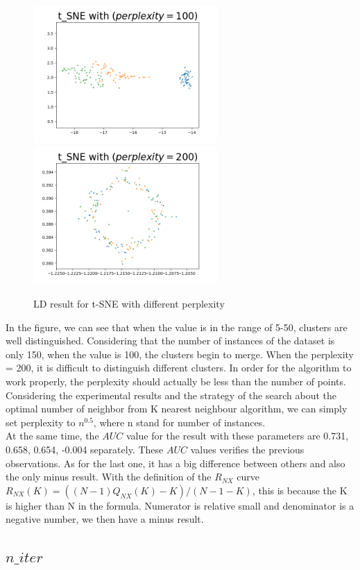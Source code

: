 \begin{figure}[H]
\centering  %
{
\label{Fig.sub.1}
\includegraphics[width=7cm,height=3.5cm\textwidth]{images/image_comparison_tsne_perp100.png}}
{
\label{Fig.sub.2}
\includegraphics[width=7cm,height=3.5cm\textwidth]{images/image_comparison_tsne_perp200.png}}
\caption{LD result for t-SNE with different perplexity}
\end{figure}


\noindent In the figure, we can see that when the value is in the range of 5-50, clusters are well distinguished. Considering that the number of instances of the dataset is only 150, when the value is 100, the clusters begin to merge. When the perplexity = 200, it is difficult to distinguish different clusters. In order for the algorithm to work properly, the perplexity should actually be less than the number of points. Considering the experimental results and the strategy of the search about the optimal number of neighbor from K nearest neighbour algorithm\cite{ref12}, we can simply set perplexity to $n^{0.5}$, where n stand for number of instances. \\

\noindent At the same time, the $AUC$ value for the result with these parameters are 0.731, 0.658, 0.654, -0.004 separately. These $AUC$ values verifies the previous observations. As for the last one, it has a big difference between others and also the only minus result. With the definition of the $R_{NX}$ curve $R_{NX} (K) = ((N − 1)Q_{NX} (K) − K) /(N − 1 − K)$, this is because the K is higher than N in the formula. Numerator is relative small and denominator is a negative number, we then have a minus result.


\subsection{$n\_iter$}

